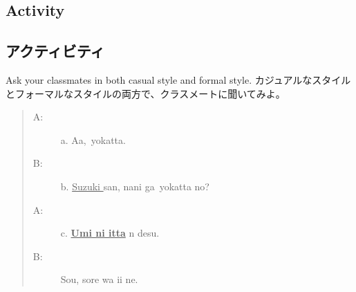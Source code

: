 \documentclass[uplatex,dvipdfmx,b5paper,english,10pt]{jsbook}
\begin{document}
\ifEnglish
\subsection{Activity}
\else
\subsection{アクティビティ}
\fi

\begin{toiquestion}
\ifEnglish
Ask your classmates in both casual style and formal style.
\else
カジュアルなスタイルとフォーマルなスタイルの両方で、クラスメートに聞いてみよ。
\fi
\end{toiquestion}

\begin{quote}
\begin{description}
 \item[A:] a. Aa, \underline{\hspace{1em}}\,yokatta.\hspace{-3.2em}\underline{\hspace{5em}}
 \item[B:] b. \underline{ Suzuki } san, nani ga \underline{\hspace{1em}}\,yokatta\hspace{-2.9em}\underline{\hspace{4em}} no?
 \item[A:] c. \underline{{\bfseries Umi ni itta}} n desu.
 \item[B:] Sou, sore wa ii ne.
\end{description}
\end{quote}
\end{document}
